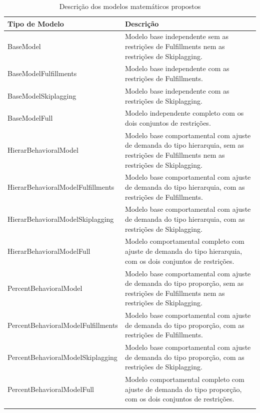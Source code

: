 \begin{small}
	\begin{longtable}{p{5.4cm} p{10.4cm}}
		\hline
		\textbf{Tipo de Modelo}            & \textbf{Descrição}                                                                                                                       \\ \hline
		BaseModel                          & Modelo base independente sem as restrições de Fulfillments nem as restrições de Skiplagging.                                             \\ \hline
		BaseModelFulfillments              & Modelo base independente com as restrições de Fulfillments.                                                                              \\ \hline
		BaseModelSkiplagging               & Modelo base independente com as restrições de Skiplagging.                                                                               \\ \hline
		BaseModelFull                      & Modelo independente completo com os dois conjuntos de restrições.                                                                        \\ \hline
		HierarBehavioralModel              & Modelo base comportamental com ajuste de demanda do tipo hierarquia, sem as restrições de Fulfillments nem as restrições de Skiplagging. \\ \hline
		HierarBehavioralModelFulfillments  & Modelo base comportamental com ajuste de demanda do tipo hierarquia, com as restrições de Fulfillments.                                  \\ \hline
		HierarBehavioralModelSkiplagging   & Modelo base comportamental com ajuste de demanda do tipo hierarquia, com as restrições de Skiplagging.                                   \\ \hline
		HierarBehavioralModelFull          & Modelo comportamental completo com ajuste de demanda do tipo hierarquia, com os dois conjuntos de restrições.                            \\ \hline
		PercentBehavioralModel             & Modelo base comportamental com ajuste de demanda do tipo proporção, sem as restrições de Fulfillments nem as restrições de Skiplagging.  \\ \hline
		PercentBehavioralModelFulfillments & Modelo base comportamental com ajuste de demanda do tipo proporção, com as restrições de Fulfillments.                                   \\ \hline
		PercentBehavioralModelSkiplagging  & Modelo base comportamental com ajuste de demanda do tipo proporção, com as restrições de Skiplagging.                                    \\ \hline
		PercentBehavioralModelFull         & Modelo comportamental completo com ajuste de demanda do tipo proporção, com os dois conjuntos de restrições.                             \\ \hline
		\caption{Descrição dos modelos matemáticos propostos}
		\label{tab:modelos}
	\end{longtable}
\end{small}


